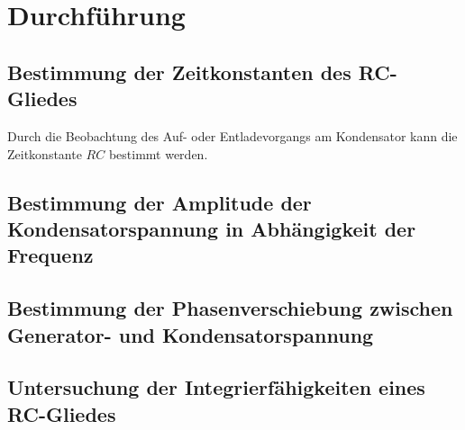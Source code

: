 
\section{Durchführung}

\subsection{Bestimmung der Zeitkonstanten des RC-Gliedes}
Durch die Beobachtung des Auf- oder Entladevorgangs am Kondensator kann
die Zeitkonstante $RC$ bestimmt werden. 

\subsection{Bestimmung der Amplitude der Kondensatorspannung in
  Abhängigkeit der Frequenz}

\subsection{Bestimmung der Phasenverschiebung zwischen Generator- und
  Kondensatorspannung}

\subsection{Untersuchung der Integrierfähigkeiten eines RC-Gliedes}
